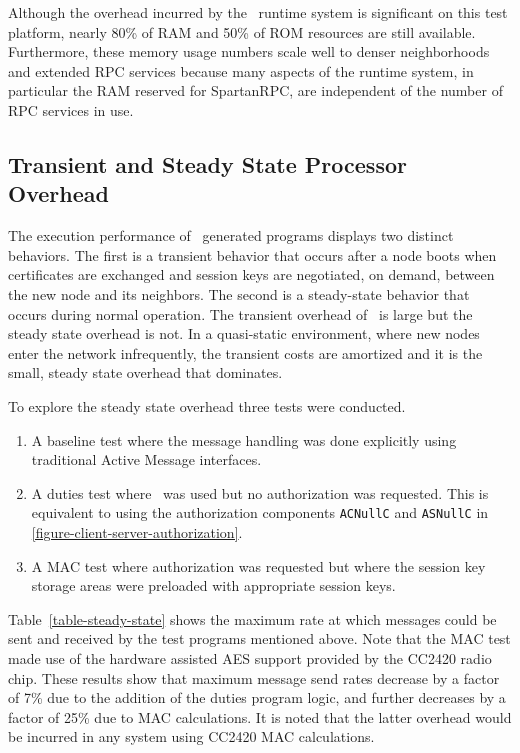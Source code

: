 Although the overhead incurred by the \Sprocket\ runtime system is significant on this test
platform, nearly 80\% of RAM and 50\% of ROM resources are still available. Furthermore, these
memory usage numbers scale well to denser neighborhoods and extended RPC services because many
aspects of the runtime system, in particular the RAM reserved for SpartanRPC, are independent of
the number of RPC services in use.

\subsection{Transient and Steady State Processor Overhead}
\label{section-sprocket-cpu-performance}

The execution performance of \Sprocket\ generated programs displays two distinct behaviors. The
first is a transient behavior that occurs after a node boots when certificates are exchanged and
session keys are negotiated, on demand, between the new node and its neighbors. The second is a
steady-state behavior that occurs during normal operation. The transient overhead of \Sprocket\
is large but the steady state overhead is not. In a quasi-static environment, where new nodes
enter the network infrequently, the transient costs are amortized and it is the small, steady
state overhead that dominates.

To explore the steady state overhead three tests were conducted.
\begin{enumerate}
\item A baseline test where the message handling was done explicitly using traditional Active
  Message interfaces.
\item A duties test where \Sprocket\ was used but no authorization was requested. This is
  equivalent to using the authorization components \texttt{ACNullC} and \texttt{ASNullC} in
  \autoref{figure-client-server-authorization}.
\item A MAC test where authorization was requested but where the session key storage areas were
  preloaded with appropriate session keys.
\end{enumerate}

Table~\ref{table-steady-state} shows the maximum rate at which messages could be sent and
received by the test programs mentioned above. Note that the MAC test made use of the hardware
assisted AES support provided by the CC2420 radio chip. These results show that maximum message
send rates decrease by a factor of 7\% due to the addition of the duties program logic, and
further decreases by a factor of 25\% due to MAC calculations. It is noted that the latter
overhead would be incurred in any system using CC2420 MAC calculations.


